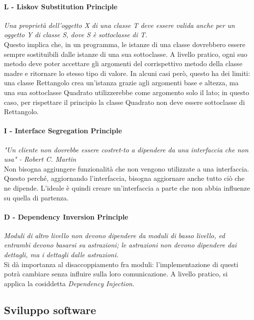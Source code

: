 \documentclass{article}
\begin{document}
        \paragraph{L - Liskov Substitution Principle} \textit{Una proprietà dell'oggetto X di una classe T deve essere valida anche per un oggetto Y di classe S, dove S è sottoclasse di T.}\\
        Questo implica che, in un programma, le istanze di una classe dovrebbero essere sempre sostituibili dalle istanze di una sua sottoclasse. A livello pratico, ogni suo metodo deve poter accettare gli argomenti del corrispettivo metodo della classe madre e ritornare lo stesso tipo di valore. In alcuni casi però, questo ha dei limiti: una classe Rettangolo crea un'istanza grazie agli argomenti base e altezza, ma una sua sottoclasse Quadrato utilizzerebbe come argomento solo il lato; in questo caso, per rispettare il principio la classe Quadrato non deve essere sottoclasse di Rettangolo.
        \paragraph{I - Interface Segregation Principle}
            \textit{"Un cliente non dovrebbe essere costret-to a dipendere da una interfaccia che non usa" - Robert C. Martin}\\
            Non bisogna aggiungere funzionalità che non vengono utilizzate a una interfaccia. Questo perché, aggiornando l'interfaccia, bisogna aggiornare anche tutto ciò che ne dipende. L'ideale è quindi creare un'interfaccia a parte che non abbia influenze su quella di partenza.
        \paragraph{D - Dependency Inversion Principle} 
            \textit{Moduli di altro livello non devono dipendere da moduli di basso livello, ed entrambi devono basarsi su astrazioni; le astrazioni non devono dipendere dai dettagli, ma i dettagli dalle astrazioni.}\\
            Si dà importanza al disaccoppiamento fra moduli: l'implementazione di questi potrà cambiare senza influire sulla loro comunicazione. A livello pratico, si applica la cosiddetta \textit{Dependency Injection}.
    \subsection{Sviluppo software}
\end{document}
